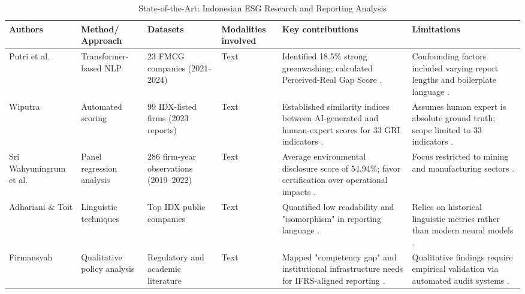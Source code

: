 \documentclass[english, online, cse, master]{dithesis}
\begin{document}
\begin{landscape}
\begin{table}[p]
\centering
\caption{State-of-the-Art: Indonesian ESG Research and Reporting Analysis}
\label{tab:indonesian-esg-research-reporting-analysis}
\small
\renewcommand{\arraystretch}{1.2}
\begin{tabularx}{\linewidth}{|p{2.5cm}|p{2cm}|p{3cm}|p{1.8cm}|X|X|}
\hline
Authors & Method/ Approach & Datasets & Modalities involved & Key contributions & Limitations \\ \hline
Putri et al.  \parencite{anisa_kusuma_putri_4109a23b} & Transformer-based NLP & 23 FMCG companies (2021–2024) & Text & Identified 18.5\% strong greenwashing; calculated Perceived-Real Gap Score  \parencite{anisa_kusuma_putri_4109a23b}. & Confounding factors included varying report lengths and boilerplate language  \parencite{anisa_kusuma_putri_4109a23b}. \\ \hline
Wiputra  \parencite{richard_wiputra_699f6060} & Automated scoring & 99 IDX-listed firms (2023 reports) & Text & Established similarity indices between AI-generated and human-expert scores for 33 GRI indicators  \parencite{richard_wiputra_699f6060}. & Assumes human expert is absolute ground truth; scope limited to 33 indicators  \parencite{richard_wiputra_699f6060}. \\ \hline
Sri Wahyuningrum et al.  \parencite{indah_fajarini_sri_wahyuningrum_1ce983fb} & Panel regression analysis & 286 firm-year observations (2019–2022) & Text & Average environmental disclosure score of 54.94\%; favor certification over operational impacts  \parencite{indah_fajarini_sri_wahyuningrum_1ce983fb}. & Focus restricted to mining and manufacturing sectors  \parencite{indah_fajarini_sri_wahyuningrum_1ce983fb}. \\ \hline
Adhariani \& Toit  \parencite{desi_adhariani_toit_543335d6} & Linguistic techniques & Top IDX public companies & Text & Quantified low readability and "isomorphism" in reporting language  \parencite{desi_adhariani_toit_543335d6}. & Relies on historical linguistic metrics rather than modern neural models  \parencite{desi_adhariani_toit_543335d6}. \\ \hline
Firmansyah  \parencite{amrie_firmansyah_fd5249a2} & Qualitative policy analysis & Regulatory and academic literature & Text & Mapped "competency gap" and institutional infrastructure needs for IFRS-aligned reporting  \parencite{amrie_firmansyah_fd5249a2}. & Qualitative findings require empirical validation via automated audit systems  \parencite{amrie_firmansyah_fd5249a2}. \\ \hline

\end{tabularx}
\end{table}
\end{landscape}
\end{document}
